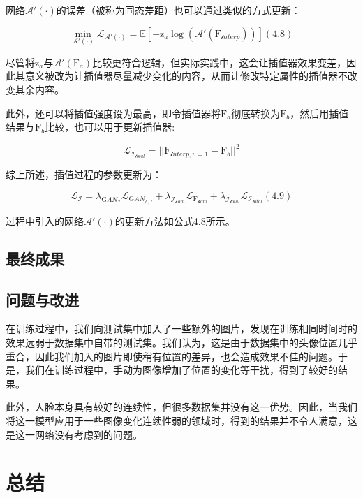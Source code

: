 \documentclass[UTF8,a4paper，12pt]{article}
\def\MC {\mathcal}
\theoremstyle{theorem}
\theoremstyle{definition}
\begin{document}
网络$\MC A'(\cdot)$的误差（被称为同态差距）也可以通过类似的方式更新：

$$\min_ {\MC A'(\cdot)} \MC L_{\MC A'(\cdot)} = \mathbb E [-\mathrm z_a\log(\MC A'(\mathrm F_{\MC interp}))]    (4.8)$$

尽管将$\mathrm z_a$与$\MC A'(\mathrm F_a)$比较更符合逻辑，但实际实践中，这会让插值器效果变差，因此其意义被改为让插值器尽量减少变化的内容，从而让修改特定属性的插值器不改变其余内容。

此外，还可以将插值强度设为最高，即令插值器将$\mathrm F_a$彻底转换为$\mathrm F_b$，然后用插值结果与$\mathrm F_b$比较，也可以用于更新插值器:

$$\MC L_{\MC I_{\MC total}} = ||\mathrm F_{\MC interp,v=1} - \mathrm F_b||^2$$

综上所述，插值过程的参数更新为：

$$\MC L_{\MC I} = \lambda_{\mathrm GAN_{\MC I}}\MC L_{\mathrm GAN_{\MC E,I}} + \lambda_{\MC I_{\MC hom}}\MC L_{\mathrm F_{\MC hom}} + \lambda_{\MC I_{\MC total}}\MC L_{\MC I_{\MC total}}    (4.9)$$

过程中引入的网络$\MC A'(\cdot)$的更新方法如公式4.8所示。

\subsection{最终成果}

\subsection{问题与改进}

在训练过程中，我们向测试集中加入了一些额外的图片，发现在训练相同时间时的效果远弱于数据集中自带的测试集。我们认为，这是由于数据集中的头像位置几乎重合，因此我们加入的图片即使稍有位置的差异，也会造成效果不佳的问题。于是，我们在训练过程中，手动为图像增加了位置的变化等干扰，得到了较好的结果。

此外，人脸本身具有较好的连续性，但很多数据集并没有这一优势。因此，当我们将这一模型应用于一些图像变化连续性弱的领域时，得到的结果并不令人满意，这是这一网络没有考虑到的问题。

\section{总结}
\end{document}
